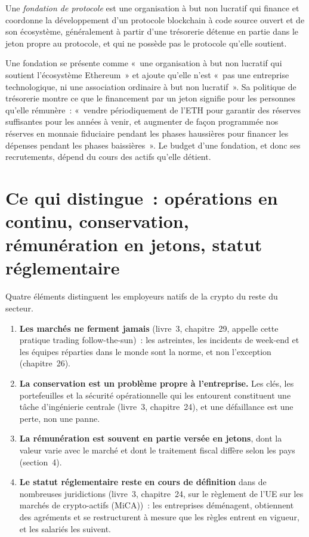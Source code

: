 \begin{definition}\label{def:in:crypto-native-firms:foundation}
Une \emph{fondation de protocole} est une organisation à but non lucratif qui finance et coordonne la
développement d'un protocole blockchain à code source ouvert et de son écosystème, généralement à partir d'une trésorerie détenue en partie dans le
jeton propre au protocole, et qui ne possède pas le protocole qu'elle soutient.
\end{definition}

Une fondation se présente comme «~une organisation à but non lucratif qui soutient l'écosystème Ethereum~» et ajoute qu'elle n'est «~pas une
entreprise technologique, ni une association ordinaire à but non lucratif~». Sa politique de trésorerie montre ce que le financement par un jeton signifie pour les personnes qu'elle rémunère~:
«~vendre périodiquement de l'ETH pour garantir des réserves suffisantes pour les années à venir, et augmenter de façon programmée nos réserves en monnaie fiduciaire
pendant les phases haussières pour financer les dépenses pendant les phases baissières~». Le budget d'une fondation, et donc ses recrutements, dépend du
cours des actifs qu'elle détient.

\section{Ce qui distingue~: opérations en continu, conservation, rémunération en jetons, statut réglementaire}

Quatre éléments distinguent les employeurs natifs de la crypto du reste du secteur.
\begin{enumerate}
\item \textbf{Les marchés ne ferment jamais} (livre~3, chapitre~29, appelle cette pratique trading follow-the-sun)~: les astreintes,
les incidents de week-end et les équipes réparties dans le monde sont la norme, et non l'exception (chapitre~26).
\item \textbf{La conservation est un problème propre à l'entreprise.} Les clés, les portefeuilles et la sécurité opérationnelle qui les entourent constituent une
tâche d'ingénierie centrale (livre~3, chapitre~24), et une défaillance est une perte, non une panne.
\item \textbf{La rémunération est souvent en partie versée en jetons}, dont la valeur varie avec le marché et dont le traitement fiscal diffère selon les
pays (section~4).
\item \textbf{Le statut réglementaire reste en cours de définition} dans de nombreuses juridictions (livre~3, chapitre~24, sur le
règlement de l'UE sur les marchés de crypto-actifs (MiCA))~: les entreprises déménagent, obtiennent des agréments et se restructurent à mesure que les règles entrent en vigueur, et les salariés les suivent.
\end{enumerate}

